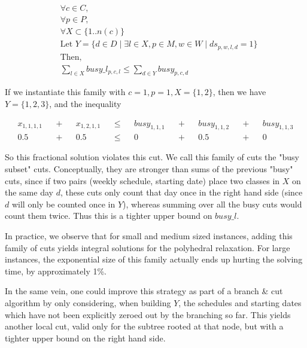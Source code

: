 \begin{align*}
&\forall c \in C,\\
&\forall p \in P,\\
&\forall X \subset \{1 .. n(c)\}\\
&\text{Let }Y = \{d \in D \mid \exists l \in X, p \in M, w \in W \mid ds_{p, w, l, d} = 1\}\\
&\text{Then, }\\
&\sum_{l \in X} busy\_l_{p, c, l} \le \sum_{d \in Y} busy_{p, c, d}
\end{align*}

If we instantiate this family with $c = 1, p = 1, X = \{1, 2\}$, then we have $Y = \{1, 2, 3\}$, and the inequality

\begin{align*}
&x_{1, 1, 1, 1}& &+& &x_{1, 2, 1, 1}& &\le& &busy_{1, 1, 1}& &+& &busy_{1, 1, 2}& &+& &busy_{1, 1, 3}&\\
&0.5& &+& &0.5& &\le& &0& &+& &0.5& &+& &0&
\end{align*}

So this fractional solution violates this cut. We call this family of cuts the "busy subset" cuts. Conceptually, they are stronger than sums of the previous "busy" cuts, since if two pairs (weekly schedule, starting date) place two classes in $X$ on the same day $d$, these cuts only count that day once in the right hand side (since $d$ will only be counted once in $Y$), whereas summing over all the busy cuts would count them twice. Thus this is a tighter upper bound on $busy\_l$.

In practice, we observe that for small and medium sized instances, adding this family of cuts yields integral solutions for the polyhedral relaxation. For large instances, the exponential size of this family actually ends up hurting the solving time, by approximately 1\%.

In the same vein, one could improve this strategy as part of a branch \& cut algorithm by only considering, when building $Y$, the schedules and starting dates which have not been explicitly zeroed out by the branching so far. This yields another local cut, valid only for the subtree rooted at that node, but with a tighter upper bound on the right hand side.
